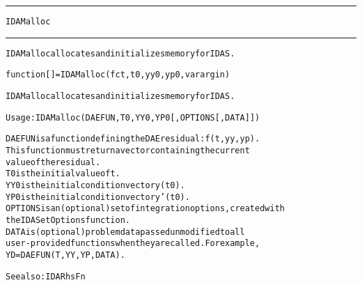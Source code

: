 \begin{samepage}
\hrule
\begin{center}
{\large \verb!IDAMalloc!}
\label{p:IDAMalloc}
\end{center}
\hrule\vspace{0.1in}



\begin{alltt}
IDAMalloc allocates and initializes memory for IDAS.
\end{alltt}

\end{samepage}



\begin{samepage}


\begin{alltt}
function [] = IDAMalloc(fct,t0,yy0,yp0,varargin) 
\end{alltt}

\end{samepage}



\begin{alltt}
IDAMalloc allocates and initializes memory for IDAS.

   Usage: IDAMalloc ( DAEFUN, T0, YY0, YP0 [, OPTIONS [, DATA] ] ) 

   DAEFUN   is a function defining the DAE residual: f(t,yy,yp).
            This function must return a vector containing the current 
            value of the residual.
   T0       is the initial value of t.
   YY0      is the initial condition vector y(t0).  
   YP0      is the initial condition vector y'(t0).  
   OPTIONS  is an (optional) set of integration options, created with
            the IDASetOptions function. 
   DATA     is (optional) problem data passed unmodified to all
            user-provided functions when they are called. For example,
            YD = DAEFUN(T,YY,YP,DATA).

  See also: IDARhsFn
\end{alltt}






\vspace{0.1in}